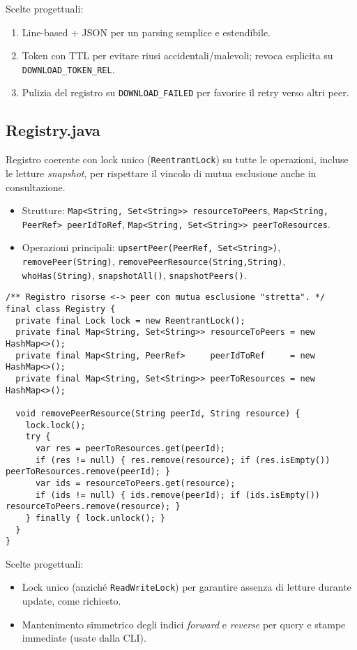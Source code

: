 \documentclass[a4paper,12pt]{article}
\begin{document}
Scelte progettuali:
\begin{enumerate}[nosep]
  \item Line-based + JSON per un parsing semplice e estendibile.
  \item Token con TTL per evitare riusi accidentali/malevoli; revoca esplicita su \texttt{DOWNLOAD\_TOKEN\_REL}.
  \item Pulizia del registro su \texttt{DOWNLOAD\_FAILED} per favorire il retry verso altri peer.
\end{enumerate}

\subsection*{Registry.java}
Registro coerente con lock unico (\texttt{ReentrantLock}) su tutte le operazioni, incluse le letture \emph{snapshot}, per rispettare il vincolo di mutua esclusione anche in consultazione.
\begin{itemize}[nosep]
  \item Strutture: \texttt{Map<String, Set<String>> resourceToPeers}, \texttt{Map<String, PeerRef> peerIdToRef}, \texttt{Map<String, Set<String>> peerToResources}.
  \item Operazioni principali: \texttt{upsertPeer(PeerRef, Set<String>)}, \texttt{removePeer(String)}, \texttt{removePeerResource(String,String)}, \texttt{whoHas(String)}, \texttt{snapshotAll()}, \texttt{snapshotPeers()}.
\end{itemize}

\begin{lstlisting}
/** Registro risorse <-> peer con mutua esclusione "stretta". */
final class Registry {
  private final Lock lock = new ReentrantLock();
  private final Map<String, Set<String>> resourceToPeers = new HashMap<>();
  private final Map<String, PeerRef>     peerIdToRef     = new HashMap<>();
  private final Map<String, Set<String>> peerToResources = new HashMap<>();

  void removePeerResource(String peerId, String resource) {
    lock.lock();
    try {
      var res = peerToResources.get(peerId);
      if (res != null) { res.remove(resource); if (res.isEmpty()) peerToResources.remove(peerId); }
      var ids = resourceToPeers.get(resource);
      if (ids != null) { ids.remove(peerId); if (ids.isEmpty()) resourceToPeers.remove(resource); }
    } finally { lock.unlock(); }
  }
}
\end{lstlisting}

Scelte progettuali:
\begin{itemize}[nosep]
  \item Lock unico (anziché \texttt{ReadWriteLock}) per garantire assenza di letture durante update, come richiesto.
  \item Mantenimento simmetrico degli indici \emph{forward} e \emph{reverse} per query e stampe immediate (usate dalla CLI).
\end{itemize}
\end{document}
